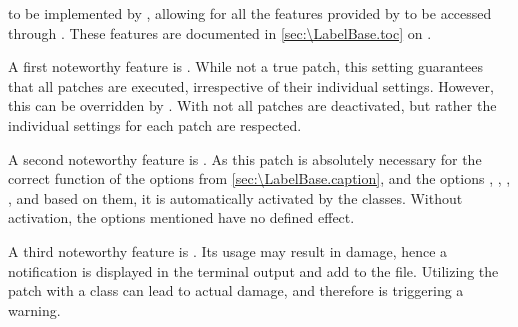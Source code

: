 \begin{table}
\begin{desctabular}
{      to be implemented by , allowing for all the features
      provided by  to be accessed through
      . These features are documented in
      \autoref{sec:\LabelBase.toc} on .%
    }%
  \end{desctabular}
\end{table}

A first noteworthy feature is
%
. While not a true patch, this setting
guarantees that all patches are executed, irrespective of their individual
settings. However, this can be overridden by
%
. With
 not all patches are deactivated, but rather
the individual settings for each patch are respected.

A second noteworthy feature is %
%
. As this patch is absolutely necessary for
the correct function of the options from \autoref{sec:\LabelBase.caption},
 and the \KOMAScript{} options
,
,
,
,
 and
 based on them, it is
automatically activated by the \KOMAScript{} classes. Without activation, the
options mentioned have no defined effect.

A third noteworthy feature is
%
%
. Its usage may result in damage, hence a
notification is displayed in the terminal output and add to the 
file. Utilizing the patch with a \KOMAScript{} class can lead to actual
damage, and therefore is triggering a warning.

